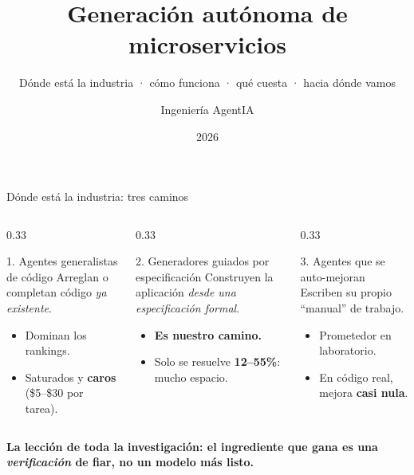 \documentclass[aspectratio=169,11pt]{beamer}
\title{\textbf{Generación autónoma de microservicios}}
\subtitle{Dónde está la industria · cómo funciona · qué cuesta · hacia dónde vamos}
\author{Ingeniería AgentIA}
\date{2026}
\begin{document}
{
\begin{frame}[plain]
  \titlepage
\end{frame}
}

\begin{frame}{Dónde está la industria: tres caminos}
  \begin{columns}[T]
    \begin{column}{0.33\textwidth}
      \begin{block}{1. Agentes generalistas de código}
        Arreglan o completan código \emph{ya existente}.
        \begin{itemize}
          \item Dominan los rankings.
          \item Saturados y \textbf{caros} (\$5--\$30 por tarea).
        \end{itemize}
      \end{block}
    \end{column}
    \begin{column}{0.33\textwidth}
      \begin{exampleblock}{2. Generadores guiados por especificación}
        Construyen la aplicación \emph{desde una especificación formal}.
        \begin{itemize}
          \item \textbf{Es nuestro camino.}
          \item Solo se resuelve \textbf{12--55\%}: mucho espacio.
        \end{itemize}
      \end{exampleblock}
    \end{column}
    \begin{column}{0.33\textwidth}
      \begin{block}{3. Agentes que se auto-mejoran}
        Escriben su propio ``manual'' de trabajo.
        \begin{itemize}
          \item Prometedor en laboratorio.
          \item En código real, mejora \textbf{casi nula}.
        \end{itemize}
      \end{block}
    \end{column}
  \end{columns}
  \vspace{1em}
  \centering
  \alert{\textbf{La lección de toda la investigación: el ingrediente que gana es una
  \emph{verificación} de fiar, no un modelo más listo.}}
\end{frame}
\end{document}
